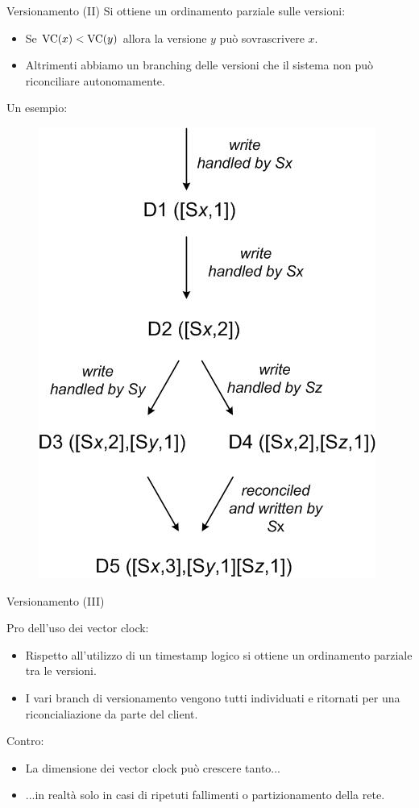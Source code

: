 \begin{frame}{Versionamento (II)}
   Si ottiene un ordinamento parziale sulle versioni:
  \begin{itemize}
  \item Se $\mathrm{VC}(x) < \mathrm{VC}(y)$ allora la versione $y$ può sovrascrivere $x$.
  \item Altrimenti abbiamo un branching delle versioni che il sistema non può riconciliare autonomamente.
  \end{itemize}
  Un esempio:
  \begin{figure}
  \centering
  \includegraphics[scale=0.3]{dynamo/versioning.png}
  \end{figure}  
\end{frame}


\begin{frame}{Versionamento (III)}
  \begin{block}{Pro dell'uso dei vector clock:}
    \begin{itemize}
    \item Rispetto all'utilizzo di un timestamp logico si ottiene un ordinamento parziale tra le versioni.
    \item I vari branch di versionamento vengono tutti individuati e ritornati per una riconcialiazione da parte del client.
    \end{itemize}
  \end{block}

  \begin{block}{Contro:}
    \begin{itemize}
    \item La dimensione dei vector clock può crescere tanto...
    \item ...in realtà solo in casi di ripetuti fallimenti o partizionamento della rete.
    \end{itemize}
  \end{block}
\end{frame}


